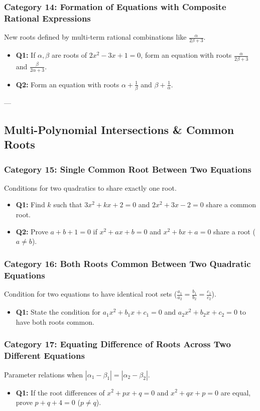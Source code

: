 \documentclass[10pt,a4paper]{article}
\begin{document}
\subsubsection{Category 14: Formation of Equations with Composite Rational Expressions}
New roots defined by multi-term rational combinations like $\frac{\alpha}{2\beta+3}$.
\begin{itemize}[leftmargin=*]
    \item \textbf{Q1:} If $\alpha, \beta$ are roots of $2x^2 - 3x + 1 = 0$, form an equation with roots $\frac{\alpha}{2\beta+3}$ and $\frac{\beta}{2\alpha+3}$.
    \item \textbf{Q2:} Form an equation with roots $\alpha + \frac{1}{\beta}$ and $\beta + \frac{1}{\alpha}$.
\end{itemize}

---

\subsection{Multi-Polynomial Intersections \& Common Roots}

\subsubsection{Category 15: Single Common Root Between Two Equations}
Conditions for two quadratics to share exactly one root.
\begin{itemize}[leftmargin=*]
    \item \textbf{Q1:} Find $k$ such that $3x^2 + kx + 2 = 0$ and $2x^2 + 3x - 2 = 0$ share a common root.
    \item \textbf{Q2:} Prove $a+b+1 = 0$ if $x^2 + ax + b = 0$ and $x^2 + bx + a = 0$ share a root ($a \neq b$).
\end{itemize}

\subsubsection{Category 16: Both Roots Common Between Two Quadratic Equations}
Condition for two equations to have identical root sets ($\frac{a_1}{a_2} = \frac{b_1}{b_2} = \frac{c_1}{c_2}$).
\begin{itemize}[leftmargin=*]
    \item \textbf{Q1:} State the condition for $a_1 x^2 + b_1 x + c_1 = 0$ and $a_2 x^2 + b_2 x + c_2 = 0$ to have both roots common.
\end{itemize}

\subsubsection{Category 17: Equating Difference of Roots Across Two Different Equations}
Parameter relations when $|\alpha_1 - \beta_1| = |\alpha_2 - \beta_2|$.
\begin{itemize}[leftmargin=*]
    \item \textbf{Q1:} If the root differences of $x^2 + px + q = 0$ and $x^2 + qx + p = 0$ are equal, prove $p+q+4 = 0$ ($p \neq q$).
\end{itemize}
\end{document}

